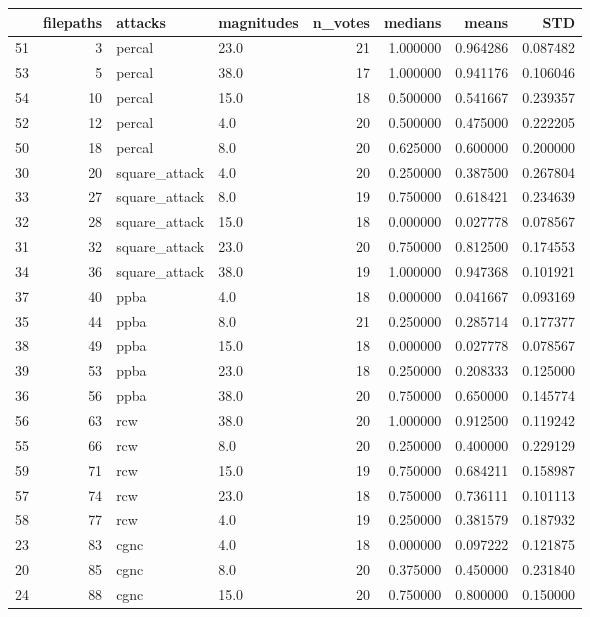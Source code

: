 \begin{tabular}{lrllrrrr}
\toprule
 & filepaths & attacks & magnitudes & n_votes & medians & means & STD \\
\midrule
51 & 3 & percal & 23.0 & 21 & 1.000000 & 0.964286 & 0.087482 \\
53 & 5 & percal & 38.0 & 17 & 1.000000 & 0.941176 & 0.106046 \\
54 & 10 & percal & 15.0 & 18 & 0.500000 & 0.541667 & 0.239357 \\
52 & 12 & percal & 4.0 & 20 & 0.500000 & 0.475000 & 0.222205 \\
50 & 18 & percal & 8.0 & 20 & 0.625000 & 0.600000 & 0.200000 \\
30 & 20 & square_attack & 4.0 & 20 & 0.250000 & 0.387500 & 0.267804 \\
33 & 27 & square_attack & 8.0 & 19 & 0.750000 & 0.618421 & 0.234639 \\
32 & 28 & square_attack & 15.0 & 18 & 0.000000 & 0.027778 & 0.078567 \\
31 & 32 & square_attack & 23.0 & 20 & 0.750000 & 0.812500 & 0.174553 \\
34 & 36 & square_attack & 38.0 & 19 & 1.000000 & 0.947368 & 0.101921 \\
37 & 40 & ppba & 4.0 & 18 & 0.000000 & 0.041667 & 0.093169 \\
35 & 44 & ppba & 8.0 & 21 & 0.250000 & 0.285714 & 0.177377 \\
38 & 49 & ppba & 15.0 & 18 & 0.000000 & 0.027778 & 0.078567 \\
39 & 53 & ppba & 23.0 & 18 & 0.250000 & 0.208333 & 0.125000 \\
36 & 56 & ppba & 38.0 & 20 & 0.750000 & 0.650000 & 0.145774 \\
56 & 63 & rcw & 38.0 & 20 & 1.000000 & 0.912500 & 0.119242 \\
55 & 66 & rcw & 8.0 & 20 & 0.250000 & 0.400000 & 0.229129 \\
59 & 71 & rcw & 15.0 & 19 & 0.750000 & 0.684211 & 0.158987 \\
57 & 74 & rcw & 23.0 & 18 & 0.750000 & 0.736111 & 0.101113 \\
58 & 77 & rcw & 4.0 & 19 & 0.250000 & 0.381579 & 0.187932 \\
23 & 83 & cgnc & 4.0 & 18 & 0.000000 & 0.097222 & 0.121875 \\
20 & 85 & cgnc & 8.0 & 20 & 0.375000 & 0.450000 & 0.231840 \\
24 & 88 & cgnc & 15.0 & 20 & 0.750000 & 0.800000 & 0.150000 \\

\end{tabular}
